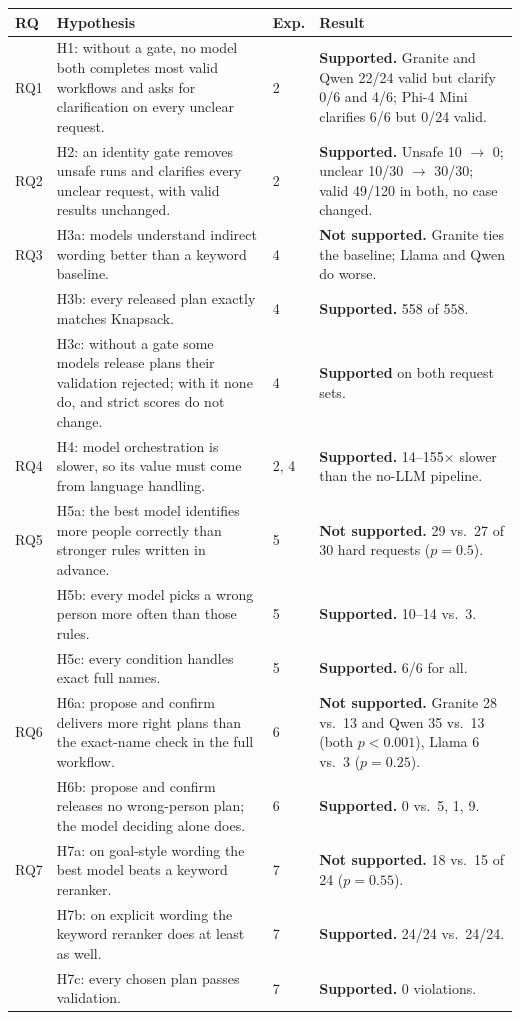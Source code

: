 \documentclass[11pt]{article}
\begin{document}
{\small
\begin{xltabular}{\textwidth}{@{}l>{\raggedright\arraybackslash}X l >{\raggedright\arraybackslash}p{4.3cm}@{}}
\toprule
\textbf{RQ} & \textbf{Hypothesis} & \textbf{Exp.} & \textbf{Result} \\
\midrule
\endhead
RQ1 & H1: without a gate, no model both completes most valid workflows and asks for clarification on every unclear request. & 2 & \textbf{Supported.} Granite and Qwen 22/24 valid but clarify 0/6 and 4/6; Phi-4 Mini clarifies 6/6 but 0/24 valid. \\
RQ2 & H2: an identity gate removes unsafe runs and clarifies every unclear request, with valid results unchanged. & 2 & \textbf{Supported.} Unsafe 10 $\to$ 0; unclear 10/30 $\to$ 30/30; valid 49/120 in both, no case changed. \\
RQ3 & H3a: models understand indirect wording better than a keyword baseline. & 4 & \textbf{Not supported.} Granite ties the baseline; Llama and Qwen do worse. \\
 & H3b: every released plan exactly matches Knapsack. & 4 & \textbf{Supported.} 558 of 558. \\
 & H3c: without a gate some models release plans their validation rejected; with it none do, and strict scores do not change. & 4 & \textbf{Supported} on both request sets. \\
RQ4 & H4: model orchestration is slower, so its value must come from language handling. & 2, 4 & \textbf{Supported.} 14--155$\times$ slower than the no-LLM pipeline. \\
RQ5 & H5a: the best model identifies more people correctly than stronger rules written in advance. & 5 & \textbf{Not supported.} 29 vs.\ 27 of 30 hard requests ($p=0.5$). \\
 & H5b: every model picks a wrong person more often than those rules. & 5 & \textbf{Supported.} 10--14 vs.\ 3. \\
 & H5c: every condition handles exact full names. & 5 & \textbf{Supported.} 6/6 for all. \\
RQ6 & H6a: propose and confirm delivers more right plans than the exact-name check in the full workflow. & 6 & \textbf{Not supported.} Granite 28 vs.\ 13 and Qwen 35 vs.\ 13 (both $p<0.001$), Llama 6 vs.\ 3 ($p=0.25$). \\
 & H6b: propose and confirm releases no wrong-person plan; the model deciding alone does. & 6 & \textbf{Supported.} 0 vs.\ 5, 1, 9. \\
RQ7 & H7a: on goal-style wording the best model beats a keyword reranker. & 7 & \textbf{Not supported.} 18 vs.\ 15 of 24 ($p=0.55$). \\
 & H7b: on explicit wording the keyword reranker does at least as well. & 7 & \textbf{Supported.} 24/24 vs.\ 24/24. \\
 & H7c: every chosen plan passes validation. & 7 & \textbf{Supported.} 0 violations. \\
\bottomrule
\end{xltabular}}
\end{document}
